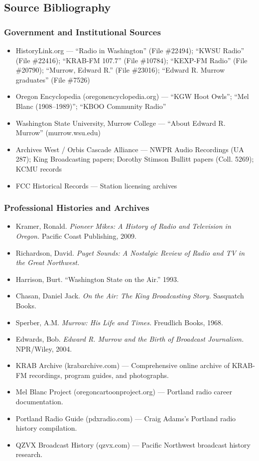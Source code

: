 \documentclass[11pt,letterpaper]{article}
\begin{document}
\subsection{Source Bibliography}

\subsubsection{Government and Institutional Sources}

\begin{itemize}[leftmargin=2em]
\item HistoryLink.org --- ``Radio in Washington'' (File \#22494); ``KWSU Radio'' (File \#22416); ``KRAB-FM 107.7'' (File \#10784); ``KEXP-FM Radio'' (File \#20790); ``Murrow, Edward R.'' (File \#23016); ``Edward R. Murrow graduates'' (File \#7526)
\item Oregon Encyclopedia (oregonencyclopedia.org) --- ``KGW Hoot Owls''; ``Mel Blanc (1908--1989)''; ``KBOO Community Radio''
\item Washington State University, Murrow College --- ``About Edward R. Murrow'' (murrow.wsu.edu)
\item Archives West / Orbis Cascade Alliance --- NWPR Audio Recordings (UA 287); King Broadcasting papers; Dorothy Stimson Bullitt papers (Coll. 5269); KCMU records
\item FCC Historical Records --- Station licensing archives
\end{itemize}

\subsubsection{Professional Histories and Archives}

\begin{itemize}[leftmargin=2em]
\item Kramer, Ronald. \textit{Pioneer Mikes: A History of Radio and Television in Oregon.} Pacific Coast Publishing, 2009.
\item Richardson, David. \textit{Puget Sounds: A Nostalgic Review of Radio and TV in the Great Northwest.}
\item Harrison, Burt. ``Washington State on the Air.'' 1993.
\item Chasan, Daniel Jack. \textit{On the Air: The King Broadcasting Story.} Sasquatch Books.
\item Sperber, A.M. \textit{Murrow: His Life and Times.} Freudlich Books, 1968.
\item Edwards, Bob. \textit{Edward R. Murrow and the Birth of Broadcast Journalism.} NPR/Wiley, 2004.
\item KRAB Archive (krabarchive.com) --- Comprehensive online archive of KRAB-FM recordings, program guides, and photographs.
\item Mel Blanc Project (oregoncartoonproject.org) --- Portland radio career documentation.
\item Portland Radio Guide (pdxradio.com) --- Craig Adams's Portland radio history compilation.
\item QZVX Broadcast History (qzvx.com) --- Pacific Northwest broadcast history research.
\end{itemize}
\end{document}
